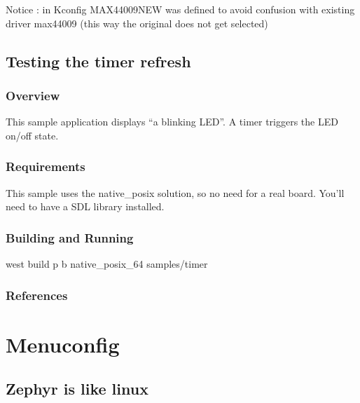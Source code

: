 \documentclass[letterpaper,10pt,english]{sphinxmanual}
\begin{document}
Notice :  in Kconfig MAX44009NEW was defined to avoid confusion with existing driver max44009
(this way the original does not get selected)


\section{Testing the timer refresh}
\label{\detokenize{samples/samplestimerREADME:testing-the-timer-refresh}}\label{\detokenize{samples/samplestimerREADME:sdl-sample}}\label{\detokenize{samples/samplestimerREADME::doc}}

\subsection{Overview}
\label{\detokenize{samples/samplestimerREADME:overview}}
This sample application displays “a blinking LED”.
A timer triggers the LED on/off state.


\subsection{Requirements}
\label{\detokenize{samples/samplestimerREADME:requirements}}
This sample uses the native\_posix solution, so no need for a real board.
You’ll need to have a SDL library installed.


\subsection{Building and Running}
\label{\detokenize{samples/samplestimerREADME:building-and-running}}
west build \sphinxhyphen{}p \sphinxhyphen{}b native\_posix\_64 samples/timer


\subsection{References}
\label{\detokenize{samples/samplestimerREADME:references}}

\chapter{Menuconfig}
\label{\detokenize{menuconfig:menuconfig}}\label{\detokenize{menuconfig::doc}}

\section{Zephyr is like linux}
\label{\detokenize{menuconfig:zephyr-is-like-linux}}
\end{document}
